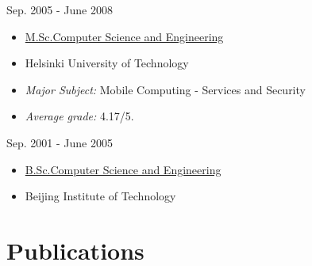 \documentclass[a4paper]{twentysecondcv} %
\begin{document}
\begin{minipage}{0.15\linewidth}
  Sep. 2005 - June 2008
\end{minipage}\hfill
\begin{minipage}{0.85\linewidth}
  \begin{itemize}
  \item \underline{M.Sc.Computer Science and Engineering}
  \item Helsinki University of Technology
  \item {\it Major Subject:} Mobile Computing - Services and Security
  \item {\it Average grade:} 4.17/5.
  \end{itemize}
\end{minipage}
\vspace{3mm}

\begin{minipage}{0.15\linewidth}
  Sep. 2001 - June 2005
\end{minipage}\hfill
\begin{minipage}{0.85\linewidth}
  \begin{itemize}
  \item \underline{B.Sc.Computer Science and Engineering}
  \item Beijing Institute of Technology
  \end{itemize}
\end{minipage}



\section{Publications}
\end{document}
